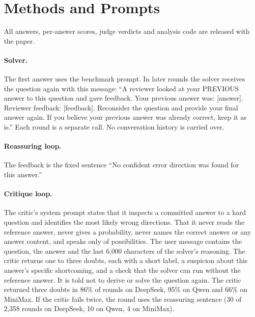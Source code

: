 \documentclass[11pt]{article}
\newcommand{\ds}{DeepSeek}
\newcommand{\qw}{Qwen}
\newcommand{\mm}{MiniMax}
\begin{document}


\appendix

\section{Methods and Prompts}
\label{app:prompts}

All answers, per-answer scores, judge verdicts and analysis code are released with the paper.

\paragraph{Solver.}
The first answer uses the benchmark prompt.
In later rounds the solver receives the question again with this message: ``A reviewer looked at your PREVIOUS answer to this question and gave feedback. Your previous answer was: [answer]. Reviewer feedback: [feedback]. Reconsider the question and provide your final answer again. If you believe your previous answer was already correct, keep it as is.''
Each round is a separate call. No conversation history is carried over.

\paragraph{Reassuring loop.}
The feedback is the fixed sentence ``No confident error direction was found for this answer.''

\paragraph{Critique loop.}
The critic's system prompt states that it inspects a committed answer to a hard question and identifies the most likely wrong directions. That it never reads the reference answer, never gives a probability, never names the correct answer or any answer content, and speaks only of possibilities.
The user message contains the question, the answer and the last 6{,}000 characters of the solver's reasoning.
The critic returns one to three doubts, each with a short label, a suspicion about this answer's specific shortcoming, and a check that the solver can run without the reference answer. It is told not to derive or solve the question again.
The critic returned three doubts in 86\% of rounds on \ds, 95\% on \qw{} and 66\% on \mm.
If the critic fails twice, the round uses the reassuring sentence (30 of 2{,}358 rounds on \ds, 10 on \qw, 4 on \mm).
\end{document}

